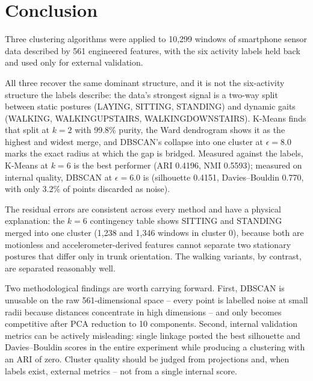 \documentclass[12pt,a4paper]{article}
\DeclareRobustCommand{\_}{\textunderscore\allowbreak}
\begin{document}
\section{Conclusion}
Three clustering algorithms were applied to 10,299 windows of
smartphone sensor data described by 561 engineered features, with the six
activity labels held back and used only for external validation.

All three recover the same dominant structure, and it is not the six-activity
structure the labels describe: the data's strongest signal is a two-way split
between static postures (LAYING, SITTING, STANDING) and dynamic gaits
(WALKING, WALKING\_UPSTAIRS, WALKING\_DOWNSTAIRS). K-Means finds that split at
$k = 2$ with 99.8\% purity, the Ward dendrogram shows it as the highest and
widest merge, and DBSCAN's collapse into one cluster at $\epsilon = 8.0$ marks
the exact radius at which the gap is bridged. Measured against the labels,
K-Means at $k = 6$ is the best performer (ARI 0.4196, NMI 0.5593); measured on
internal quality, DBSCAN at $\epsilon = 6.0$ is (silhouette 0.4151,
Davies--Bouldin 0.770, with only 3.2\% of points discarded as noise).

The residual errors are consistent across every method and have a physical
explanation: the $k = 6$ contingency table shows SITTING and STANDING merged
into one cluster (1,238 and 1,346 windows in cluster 0), because both are
motionless and accelerometer-derived features cannot separate two stationary
postures that differ only in trunk orientation. The walking variants, by
contrast, are separated reasonably well.

Two methodological findings are worth carrying forward. First, DBSCAN is
unusable on the raw 561-dimensional space -- every point is labelled noise at
small radii because distances concentrate in high dimensions -- and only
becomes competitive after PCA reduction to 10 components. Second, internal
validation metrics can be actively misleading: single linkage posted the best
silhouette and Davies--Bouldin scores in the entire experiment while producing
a clustering with an ARI of zero. Cluster quality should be judged from
projections and, when labels exist, external metrics -- not from a single
internal score.
\end{document}
